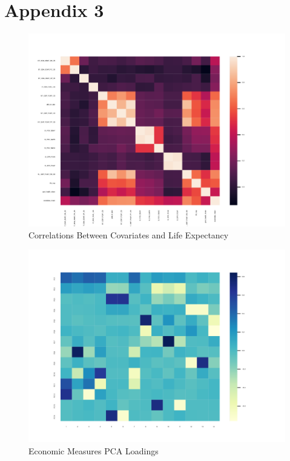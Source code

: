 \documentclass[12pt]{article}
\begin{document}
        
        
        
        


    \section*{Appendix 3}

        

        \begin{figure}[h!]
            \centering
            \caption{Correlations Between Covariates and Life Expectancy}
            \label{LE_Health_Econ_Correlations}	
            \includegraphics[width=\linewidth,keepaspectratio=true]{../Output/Figures/LE_Health_Econ_Correlations_combined.pdf}
        \end{figure}

        \begin{figure}[h!]
            \centering
            \caption{Economic Measures PCA Loadings}
            \label{Econ_Loadings}	
            \includegraphics[width=\linewidth,keepaspectratio=true]{../Output/Figures/Econ_Indicator_Loadings_combined.pdf}
        \end{figure}
\end{document}

